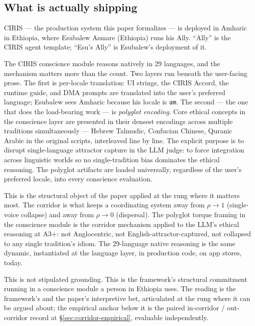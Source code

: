 \documentclass[11pt,a4paper]{article}
\begin{document}
\subsection*{What is actually shipping}

CIRIS --- the production system this paper formalizes --- is deployed in Amharic in Ethiopia, where Esubalew Asmare (Ethiopia) runs his Ally. ``Ally'' is the CIRIS agent template; ``Esu's Ally'' is Esubalew's deployment of it.

The CIRIS conscience module reasons natively in 29 languages, and the mechanism matters more than the count. Two layers run beneath the user-facing prose. The first is per-locale translation: UI strings, the CIRIS Accord, the runtime guide, and DMA prompts are translated into the user's preferred language; Esubalew sees Amharic because his locale is \texttt{am}. The second --- the one that does the load-bearing work --- is \emph{polyglot encoding}. Core ethical concepts in the conscience layer are presented in their densest encodings across multiple traditions simultaneously --- Hebrew Talmudic, Confucian Chinese, Quranic Arabic in the original scripts, interleaved line by line. The explicit purpose is to disrupt single-language attractor capture in the LLM judge: to force integration across linguistic worlds so no single-tradition bias dominates the ethical reasoning. The polyglot artifacts are loaded universally, regardless of the user's preferred locale, into every conscience evaluation.

This is the structural object of the paper applied at the rung where it matters most. The corridor is what keeps a coordinating system away from $\rho \to 1$ (single-voice collapse) and away from $\rho \to 0$ (dispersal). The polyglot torque framing in the conscience module is the corridor mechanism applied to the LLM's ethical reasoning at A3+: not Anglocentric, not English-attractor-captured, not collapsed to any single tradition's idiom. The 29-language native reasoning is the same dynamic, instantiated at the language layer, in production code, on app stores, today.

This is not stipulated grounding. This is the framework's structural commitment running in a conscience module a person in Ethiopia uses. The reading is the framework's and the paper's interpretive bet, articulated at the rung where it can be argued about; the empirical anchor below it is the paired in-corridor / out-corridor record at \S\ref{sec:corridor-empirical}, evaluable independently.
\end{document}

